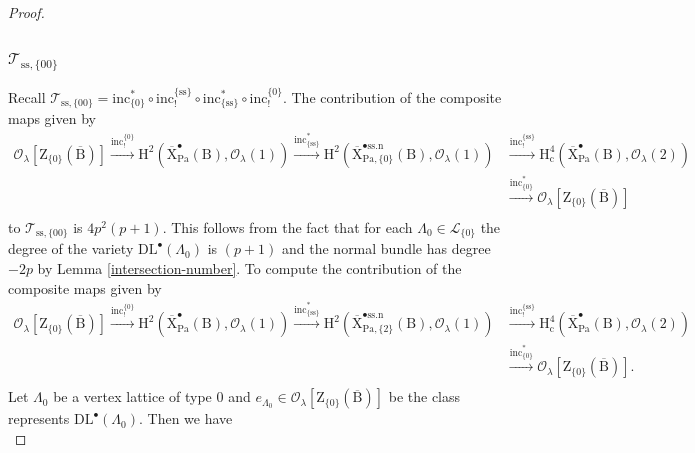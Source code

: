 \documentclass[10pt]{amsart}
\numberwithin{equation}{section}
\theoremstyle{definition}
\def\Pa{\mathrm{Pa}}
\def\calL{\mathcal{L}}
\def\calO{\mathcal{O}}
\def\calT{\mathcal{T}}
\def\rmc{\mathrm{c}}
\def\rmB{\mathrm{B}}
\def\rmH{\mathrm{H}}
\def\rmX{\mathrm{X}}
\def\rmZ{\mathrm{Z}}
\begin{document}
\begin{proof}
\subsubsection{$\calT_{\mathrm{ss},\{00\}}$} Recall $\calT_{\mathrm{ss},\{00\}}= \mathrm{inc}^{\ast}_{\{0\}}\circ \mathrm{inc}^{\{\mathrm{ss}\}}_{!}\circ \mathrm{inc}^{\ast}_{\{\mathrm{ss}\}}\circ\mathrm{inc}^{\{0\}}_{!}$. 
The contribution of the composite maps given by
\begin{equation*}
\begin{aligned}
\calO_{\lambda}[\rmZ_{\{0\}}(\overline{\rmB})]\xrightarrow{\mathrm{inc}^{\{0\}}_{!}}\rmH^{2}(\overline{\rmX}^{\bullet}_{\Pa}(\rmB), \calO_{\lambda}(1))\xrightarrow{\mathrm{inc}^{\ast}_{\{\mathrm{ss}\}}}\rmH^{2}(\overline{\rmX}^{\bullet\mathrm{ss.n}}_{\Pa, \{0\}}(\rmB), \calO_{\lambda}(1))&\xrightarrow{\mathrm{inc}^{\{\mathrm{ss}\}}_{!}} \rmH^{4}_{\rmc}(\overline{\rmX}^{\bullet}_{\Pa}(\rmB), \calO_{\lambda}(2))\\
&\xrightarrow{\mathrm{inc}^{\ast}_{\{0\}}}\calO_{\lambda}[\rmZ_{\{0\}}(\overline{\rmB})]\\
\end{aligned}
\end{equation*}
to $\calT_{\mathrm{ss},\{00\}}$ is  $4p^{2}(p+1)$. This follows from the fact that for each $\Lambda_{0}\in\calL_{\{0\}}$ the degree of the variety $\mathrm{DL}^{\bullet}(\Lambda_{0})$ is $(p+1)$ and the normal bundle has degree $-2p$ by {Lemma \ref{intersection-number}}. To compute the contribution of the composite maps given by
\begin{equation*}
\begin{aligned}
\calO_{\lambda}[\rmZ_{\{0\}}(\overline{\rmB})]\xrightarrow{\mathrm{inc}^{\{0\}}_{!}}\rmH^{2}(\overline{\rmX}^{\bullet}_{\Pa}(\rmB), \calO_{\lambda}(1))\xrightarrow{\mathrm{inc}^{\ast}_{\{\mathrm{ss}\}}}\rmH^{2}(\overline{\rmX}^{\bullet\mathrm{ss.n}}_{\Pa, \{2\}}(\rmB), \calO_{\lambda}(1))&\xrightarrow{\mathrm{inc}^{\{\mathrm{ss}\}}_{!}} \rmH^{4}_{\rmc}(\overline{\rmX}^{\bullet}_{\Pa}(\rmB), \calO_{\lambda}(2))\\
&\xrightarrow{\mathrm{inc}^{\ast}_{\{0\}}}\calO_{\lambda}[\rmZ_{\{0\}}(\overline{\rmB})].\\
\end{aligned}
\end{equation*}
Let $\Lambda_{0}$ be a vertex lattice of type $0$ and $e_{\Lambda_{0}}\in \calO_{\lambda}[\rmZ_{\{0\}}(\overline{\rmB})]$ be the class represents $\mathrm{DL}^{\bullet}(\Lambda_{0})$. Then we have 
\begin{equation*}

\end{equation*}
\end{proof}
\end{document}
